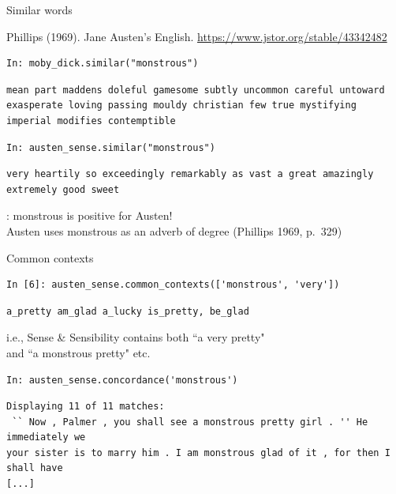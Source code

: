 \documentclass[aspectratio=169,usenames,dvipsnames]{beamer}
\begin{document}
\begin{frame}[fragile]{Similar words}
\begin{reference}
Phillips (1969). Jane Austen's English. \url{https://www.jstor.org/stable/43342482}
\end{reference}
\begin{lstlisting}
In: moby_dick.similar("monstrous")
\end{lstlisting}
\begin{lstlisting}[style=plain]
mean part maddens doleful gamesome subtly uncommon careful untoward
exasperate loving passing mouldy christian few true mystifying
imperial modifies contemptible
\end{lstlisting}
\begin{lstlisting}
In: austen_sense.similar("monstrous")
\end{lstlisting}
\begin{lstlisting}[style=plain]
very heartily so exceedingly remarkably as vast a great amazingly
extremely good sweet
\end{lstlisting}

: monstrous is positive for Austen! \\
Austen uses monstrous as an adverb of degree (Phillips 1969, p.\ 329)
\end{frame}

\begin{frame}[fragile]{Common contexts}
\begin{lstlisting}[style=smaller]
In [6]: austen_sense.common_contexts(['monstrous', 'very'])
\end{lstlisting}
\begin{lstlisting}[style=plainsmaller]
a_pretty am_glad a_lucky is_pretty, be_glad
\end{lstlisting}

\pause\vspace{1em}
i.e., Sense \& Sensibility contains both ``a very pretty" \\
    and ``a monstrous pretty" etc.

\begin{lstlisting}
In: austen_sense.concordance('monstrous')
\end{lstlisting}
\begin{lstlisting}[style=plainsmaller]
Displaying 11 of 11 matches:
 `` Now , Palmer , you shall see a monstrous pretty girl . '' He immediately we
your sister is to marry him . I am monstrous glad of it , for then I shall have
[...]
\end{lstlisting}
\end{frame}
\end{document}
